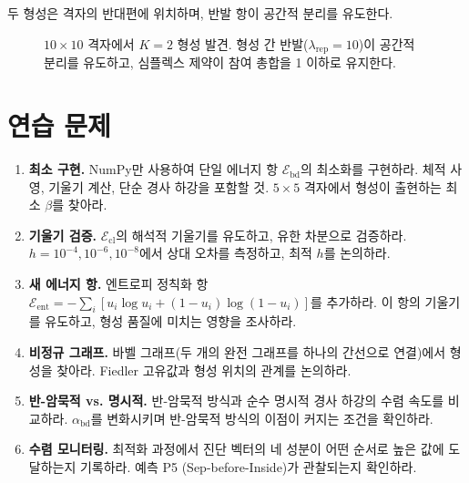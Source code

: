두 형성은 격자의 반대편에 위치하며, 반발 항이 공간적 분리를 유도한다.

\begin{figure}[t]
\centering
{}
\caption{$10 \times 10$ 격자에서 $K = 2$ 형성 발견. 형성 간 반발($\lambda_{\mathrm{rep}} = 10$)이 공간적 분리를 유도하고, 심플렉스 제약이 참여 총합을 1 이하로 유지한다.}
\label{fig:first-multi-formation}
\end{figure}


\section{연습 문제}
\label{sec:ch12-exercises}

\begin{enumerate}
    \item \textbf{최소 구현.} NumPy만 사용하여 단일 에너지 항 $\mathcal{E}_{\mathrm{bd}}$의 최소화를 구현하라. 체적 사영, 기울기 계산, 단순 경사 하강을 포함할 것. $5 \times 5$ 격자에서 형성이 출현하는 최소 $\beta$를 찾아라.

    \item \textbf{기울기 검증.} $\mathcal{E}_{\mathrm{cl}}$의 해석적 기울기를 유도하고, 유한 차분으로 검증하라. $h = 10^{-4}, 10^{-6}, 10^{-8}$에서 상대 오차를 측정하고, 최적 $h$를 논의하라.

    \item \textbf{새 에너지 항.} 엔트로피 정칙화 항 $\mathcal{E}_{\mathrm{ent}} = -\sum_i [u_i \log u_i + (1-u_i)\log(1-u_i)]$를 추가하라. 이 항의 기울기를 유도하고, 형성 품질에 미치는 영향을 조사하라.

    \item \textbf{비정규 그래프.} 바벨 그래프(두 개의 완전 그래프를 하나의 간선으로 연결)에서 형성을 찾아라. Fiedler 고유값과 형성 위치의 관계를 논의하라.

    \item \textbf{반-암묵적 vs. 명시적.} 반-암묵적 방식과 순수 명시적 경사 하강의 수렴 속도를 비교하라. $\alpha_{\mathrm{bd}}$를 변화시키며 반-암묵적 방식의 이점이 커지는 조건을 확인하라.

    \item \textbf{수렴 모니터링.} 최적화 과정에서 진단 벡터의 네 성분이 어떤 순서로 높은 값에 도달하는지 기록하라. 예측 P5 (Sep-before-Inside)가 관찰되는지 확인하라.
\end{enumerate}


